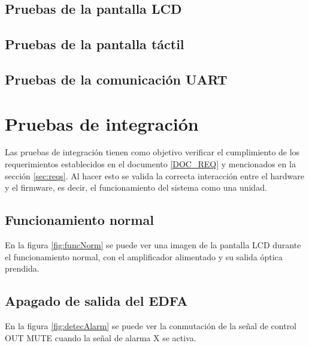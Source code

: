 \subsection{Pruebas de la pantalla LCD}



\subsection{Pruebas de la pantalla táctil}



\subsection{Pruebas de la comunicación UART}



\section{Pruebas de integración}
\label{sec:pruebasInt}

Las pruebas de integración tienen como objetivo verificar el cumplimiento de los requerimientos establecidos en el documento \ref{DOC_REQ} y mencionados en la sección \ref{sec:reqs}. Al hacer esto se valida la correcta interacción entre el hardware y el firmware, es decir, el funcionamiento del sistema como una unidad.

\subsection{Funcionamiento normal}

En la figura \ref{fig:funcNorm} se puede ver una imagen de la pantalla LCD durante el funcionamiento normal, con el amplificador alimentado y su salida óptica prendida.



\subsection{Apagado de salida del EDFA}

En la figura \ref{fig:detecAlarm} se puede ver la conmutación de la señal de control OUT MUTE cuando la señal de alarma X se activa. 

